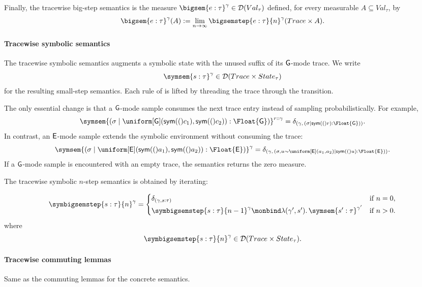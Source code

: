 Finally, the tracewise big-step semantics is the measure
$\bigsem{e:\tau}^{\gamma}\in\mathcal D(Val_\tau)$ defined, for every
measurable $A\subseteq Val_\tau$, by
\[
  \bigsem{e:\tau}^{\gamma}(A)
  :=
  \lim_{n\to\infty}
  \bigsemstep{e:\tau}{n}^{\gamma}(Trace\times A).
\]

\paragraph{Tracewise symbolic semantics}
The tracewise symbolic semantics augments a symbolic state with the unused suffix of its $\mathsf{G}$-mode trace. We write
\[
  \symsem{s:\tau}^{\gamma}
  \in
  \mathcal D(Trace\times State_\tau)
\]for the resulting small-step semantics. Each rule of
 is lifted by threading the trace
through the transition.

The only essential change is that a $\mathsf{G}$-mode sample consumes the next trace
entry instead of sampling probabilistically. For example,
\[
\symsem{
  (\sigma\mid
    \uniform[\G](\sym(c_1),\sym(c_2)):\Float{\G})
}^{r::\gamma}
=
\delta_{
  \left(
    \gamma,\,
    (\sigma\mid\sym(r):\Float{\G})
  \right)
}.
\]In contrast, an $\mathsf{E}$-mode sample extends the symbolic environment without
consuming the trace:
\[
\symsem{
  (\sigma\mid
    \uniform[\E](\sym(a_1),\sym(a_2)):\Float{\E})
}^{\gamma}
=
\delta_{
  \left(
    \gamma,\,
    (\sigma,u\sim\uniform[\E](a_1,a_2)
      \mid\sym(u):\Float{\E})
  \right)
}.
\]If a $\mathsf{G}$-mode sample is encountered with an empty trace, the semantics
returns the zero measure.

The tracewise symbolic $n$-step semantics is obtained by iterating:

\begin{align*}
  \symbigsemstep{s:\tau}{n}^{\gamma}
  =
  \begin{cases}
    \delta_{(\gamma,s:\tau)}
      & \text{if } n=0, \\[2pt]
    \symbigsemstep{s:\tau}{n-1}^{\gamma}
    \monbind
    \lambda(\gamma',s').\,
    \symsem{s':\tau}^{\gamma'}
      & \text{if } n>0.
  \end{cases}
\end{align*}
where
\[
  \symbigsemstep{s:\tau}{n}^{\gamma}
  \in
  \mathcal D(Trace\times State_\tau).
\]

\paragraph{Tracewise commuting lemmas} Same as the commuting lemmas for the concrete semantics.



